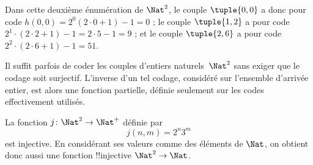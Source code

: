 \documentclass[../../../include/open-logic-section]{subfiles}
\begin{document}
\begin{explain}
Dans cette deuxième énumération de $\Nat^2$, le couple
$\tuple{0,0}$ a donc pour code $h(0,0) = 2^0(2\cdot 0+1) - 1 = 0$ ;
le couple $\tuple{1,2}$ a pour code $2^{1} \cdot (2 \cdot 2 + 1) - 1 = 2
\cdot 5 - 1 = 9$ ; et le couple $\tuple{2,6}$ a pour code
$2^{2} \cdot (2 \cdot 6 + 1) - 1 = 51$.
\end{explain}

Il suffit parfois de coder les couples d’entiers naturels~$\Nat^2$
sans exiger que le codage soit surjectif. L’inverse d’un tel codage,
considéré sur l’ensemble d’arrivée entier, est alors une fonction
partielle, définie seulement sur les codes effectivement utilisés.

\begin{ex}
La fonction $j\colon \Nat^2 \to \Nat^+$ définie par
\[
j(n,m) = 2^n3^m
\]
est injective. En considérant ses valeurs comme des éléments de
$\Nat$, on obtient donc aussi une fonction !!{injective}
$\Nat^2 \to \Nat$.
\end{ex}
\end{document}
